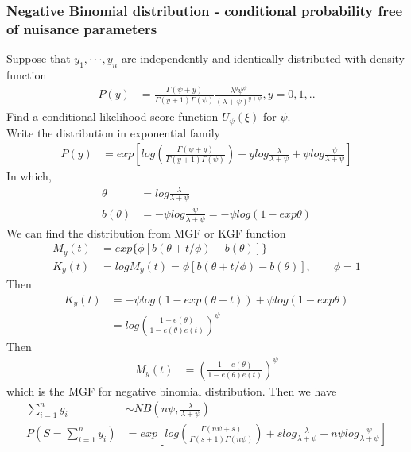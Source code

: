 \documentclass[11pt]{article} %
\begin{document}
\subsubsection{Negative Binomial distribution - conditional probability free of nuisance parameters}
Suppose that $y_1, · · · , y_n$ are independently and identically distributed with density function
\begin{align*}
	P(y) &= \frac{\Gamma(\psi + y)}{\Gamma (y+1) \Gamma (\psi)} \frac{\lambda^y \psi^{\psi}}{(\lambda + \psi)^{y+\psi} }, y= 0, 1,..  
\end{align*}
Find a conditional likelihood score function $U_{\psi}(\xi)$ for $\psi$.\\
Write the distribution in exponential family
\begin{align*}
	P(y) &=exp \left[ log \left( \frac{\Gamma(\psi + y)}{\Gamma (y+1) \Gamma (\psi)} \right) + y log \frac{\lambda }{\lambda + \psi } + \psi log \frac{\psi}{\lambda + \psi} \right] 
\end{align*}
In which,
\begin{align*}
	\theta &= log \frac{\lambda }{\lambda + \psi }\\
	b(\theta) &= -\psi log \frac{\psi}{\lambda + \psi} = -\psi log (1-exp \theta)
\end{align*}
We can find the distribution from MGF or KGF function
\begin{align*}
	M_y(t) &= exp \{\phi [b(\theta + t/\phi) - b(\theta)] \}\\
	K_y(t) &= log M_y(t) = \phi [b(\theta + t/\phi) - b(\theta)], \qquad \phi = 1
\end{align*}
Then 
\begin{align*}
	K_y(t) &= -\psi log \left( 1-exp (\theta + t) \right) + \psi log (1-exp \theta) \\
	&= log \left( \frac{1- e(\theta)}{1- e (\theta) e (t)} \right)^{\psi}
\end{align*}
Then 
\begin{align*}
	M_y(t) &= \left( \frac{1- e(\theta)}{1- e (\theta) e (t)} \right)^{\psi}
\end{align*}
which is the MGF for negative binomial distribution. Then we have
\begin{align*}
	\sum_{i=1}^n y_i & \sim NB \left( n\psi, \frac{\lambda}{\lambda + \psi} \right)\\
	P(S=\sum_{i=1}^n y_i) &=exp \left[ log \left( \frac{\Gamma(n \psi + s)}{\Gamma (s+1) \Gamma (n \psi)} \right) + s log \frac{\lambda }{\lambda + \psi } + n \psi log \frac{\psi}{\lambda + \psi} \right] 
\end{align*}
\end{document}
